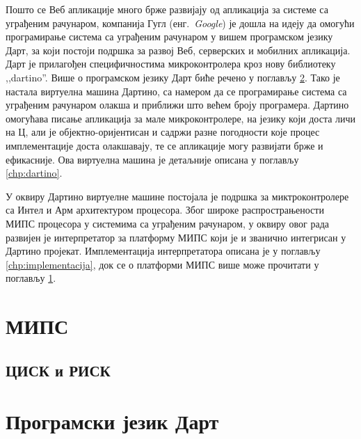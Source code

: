 \documentclass[12pt,oneside]{memoir}
\begin{document}
Пошто се Веб апликације много брже развијају од апликација за системе са уграђеним рачунаром, компанија Гугл (енг.~\textit{Google}) је дошла на идеју да омогући програмирање система са уграђеним рачунаром у вишем програмском језику Дарт, за који постоји подршка за развој Веб, серверских и мобилних апликација. Дарт је прилагођен специфичностима микроконтролера кроз нову библиотеку ,,dartino''. Више о програмском језику Дарт биће речено у поглављу \ref{chp:dart}. Тако је настала виртуелна машина Дартино, са намером да се програмирање система са уграђеним рачунаром олакша и приближи што већем броју програмера. Дартино омогућава писање апликација за мале микроконтролере, на језику који доста личи на Ц, али је објектно-оријентисан и садржи разне погодности које процес имплементације доста олакшавају, те се апликације могу развијати брже и ефикасније. Ова виртуелна машина је детаљније описана у поглављу \ref{chp:dartino}.

У оквиру Дартино виртуелне машине постојала је подршка за миктроконтролере са Интел и Арм архитектуром процесора. Због широке распрострањености МИПС процесора у системима са уграђеним рачунаром, у оквиру овог рада развијен је интерпретатор за платформу МИПС који је и званично интегрисан у Дартино пројекат. Имплементација интерпретатора описана је у поглављу \ref{chp:implementacija}, док се о платформи МИПС више може прочитати у поглављу \ref{chp:mips}.\\




\chapter{МИПС}
\label{chp:mips}

\section{ЦИСК и РИСК}



\chapter{Програмски језик Дарт}
\label{chp:dart}
\end{document}
